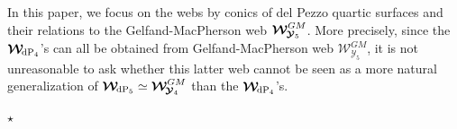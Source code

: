 \documentclass[11pt]{amsart}
\begin{document}
In this paper, we focus on the webs by conics of del Pezzo quartic surfaces and their relations to the Gelfand-MacPherson web $\boldsymbol{\mathcal W}^{GM}_{{}^{} \hspace{-0.05cm} \boldsymbol{\mathcal Y}_5  }$. More precisely, 
since the  $\boldsymbol{\mathcal W}_{  \hspace{-0.05cm} {\rm dP}_4}$'s can all be obtained from 
Gelfand-MacPherson web 
 $ \boldsymbol{\mathcal W}^{GM}_{
\boldsymbol{\mathcal Y}_5
}$, 
  it is not unreasonable to ask whether this latter web cannot be seen as a  more natural generalization of $\boldsymbol{\mathcal W}_{  \hspace{-0.05cm}{\rm dP}_5}\simeq 
 \boldsymbol{\mathcal W}^{GM}_{ \hspace{-0.05cm}
\boldsymbol{\mathcal Y}_4}$ than the $\boldsymbol{\mathcal W}_{  \hspace{-0.05cm}{\rm dP}_4}$'s. 
\begin{center}
\vspace{-0.15cm}
$\star$
\end{center}
\end{document}
